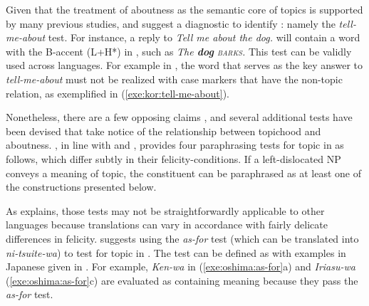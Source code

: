 Given that the treatment of aboutness as the semantic core of topics
is supported by many previous studies, \citet{reinhart:81} and
\citet{choi:99} suggest a diagnostic to identify : namely the
\textit{tell-me-about} test. For
instance, a reply to \textit{Tell me about the dog.} will contain a
word with the B-accent (L+H*) in , such as \textit{The
  \textbf{dog} \textsc{barks}.}  This test can be validly used across
languages. For example in , the word that
serves as the key answer to \textit{tell-me-about} must not be
realized with case markers that have the non-topic relation, as
exemplified in (\ref{exe:kor:tell-me-about}).




Nonetheless, there are a few opposing claims \citep{vermeulen:09}, and
several additional tests have been devised that take notice of the
relationship between topichood and aboutness.  \citet{roberts:11}, in
line with \citet{reinhart:81} and \citet{gundel:85}, provides four
paraphrasing tests for topic in  as follows, which differ
subtly in their felicity-conditions. If a
left-dislocated NP conveys a meaning of topic, the constituent can be
paraphrased as at least one of the constructions presented below.




\noindent As \citet{roberts:11} explains, those tests may not be
straightforwardly applicable to other languages because translations
can vary in accordance with fairly delicate differences in felicity.
\citet{oshima:09} suggests using the \textit{as-for} test (which can
be translated into \textit{ni-tsuite-wa}) to test for topic in
. The test can be defined as  with
examples in Japanese given in . For example,
\textit{Ken-wa} in (\ref{exe:oshima:as-for}a) and \textit{Iriasu-wa}
(\ref{exe:oshima:as-for}c) are evaluated as containing  meaning
because they pass the \textit{as-for} test.

